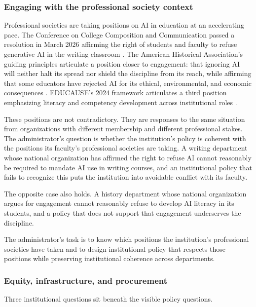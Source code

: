 \documentclass[12pt]{article}
\begin{document}
\subsubsection*{Engaging with the professional society context}

Professional societies are taking positions on AI in education at an accelerating pace. The Conference on College Composition and Communication passed a resolution in March 2026 affirming the right of students and faculty to refuse generative AI in the writing classroom \autocite{cccc2026resolutions}. The American Historical Association's guiding principles articulate a position closer to engagement: that ignoring AI will neither halt its spread nor shield the discipline from its reach, while affirming that some educators have rejected AI for its ethical, environmental, and economic consequences \autocite{aha2025guiding}. EDUCAUSE's 2024 framework articulates a third position emphasizing literacy and competency development across institutional roles \autocite{educause2024literacy}.

These positions are not contradictory. They are responses to the same situation from organizations with different membership and different professional stakes. The administrator's question is whether the institution's policy is coherent with the positions its faculty's professional societies are taking. A writing department whose national organization has affirmed the right to refuse AI cannot reasonably be required to mandate AI use in writing courses, and an institutional policy that fails to recognize this puts the institution into avoidable conflict with its faculty.

The opposite case also holds. A history department whose national organization argues for engagement cannot reasonably refuse to develop AI literacy in its students, and a policy that does not support that engagement underserves the discipline.

The administrator's task is to know which positions the institution's professional societies have taken and to design institutional policy that respects those positions while preserving institutional coherence across departments.

\subsubsection*{Equity, infrastructure, and procurement}

Three institutional questions sit beneath the visible policy questions.
\end{document}
